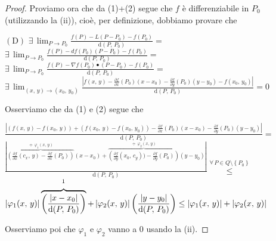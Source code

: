 \begin{proof}
Proviamo ora che da (1)+(2) segue che $f$ è differenziabile in $P_0$ (utilizzando la (ii)), cioè, per definizione, dobbiamo provare che
\begin{center}
$\mathrm{(D)}$
\hfill
$\displaystyle
\exists \, \lim_{P \rightarrow P_0} \frac{f(P)-L(P-P_0)-f(P_0)}{\mathrm{d}(P,\,P_0)} =$
\hfill \null \\
\vskip 16pt
\hfill
$\displaystyle
\exists \, \lim_{P \rightarrow P_0} \frac{f(P)-df(P_0)(P-P_0)-f(P_0)}{\mathrm{d}(P,\,P_0)} =$
\hfill \null \\
\vskip 16pt
\hfill
$\displaystyle
\exists \, \lim_{P \rightarrow P_0} \frac{f(P)-\nabla f(P_0) \bullet (P-P_0)-f(P_0)}{\mathrm{d}(P,\,P_0)} =$
\hfill \null \\
\vskip 16pt
\hfill
$\displaystyle
\exists \, \lim_{(x,\,y) \rightarrow (x_0,\,y_0)} \frac{\displaystyle \left\lvert f(x,\,y) - \frac{\partial f}{\partial x}(P_0)(x-x_0) - \frac{\partial f}{\partial y}(P_0)(y-y_0) - f(x_0,\,y_0) \right\rvert}{\mathrm{d}(P,\,P_0)} = 0$
\hfill \null \\
\end{center}

Osserviamo che da (1) e (2) segue che
\begin{center}
\hfill
$\displaystyle
\frac{\displaystyle \left\lvert (f(x,\,y)-f(x_0,\,y)) + (f(x_0,\,y)-f(x_0,\,y_0)) - \frac{\partial f}{\partial x}(P_0)(x-x_0) - \frac{\partial f}{\partial y}(P_0)(y-y_0) \right\rvert }{\mathrm{d}(P,\,P_0)} =$
\hfill \null \\
\vskip 16pt
\hfill
$\displaystyle
\frac{\displaystyle \left\lvert \overbrace{\left( \frac{\partial f}{\partial x}(c_x,\,y) - \frac{\partial f}{\partial x}(P_0) \right)}^{\doteqdot \, \varphi_1 (x,\,y)} (x-x_0) + \overbrace{\left( \frac{\partial f}{\partial y}(x_0,\,c_y)) - \frac{\partial f}{\partial y}(P_0) \right)}^{\doteqdot \, \varphi_2 (x,\,y)} (y-y_0) \right\rvert }{\mathrm{d}(P,\,P_0)} \overset{\forall \, P \in Q \setminus \left\lbrace P_0 \right\rbrace}{\leq} $
\hfill \null \\
\hfill
$\displaystyle \left\lvert \varphi_1(x,\,y) \right\rvert \overbrace{\left( \frac{|x-x_0|}{\mathrm{d}(P,\,P_0)} \right)}^{\footnotemark} + \left\lvert \varphi_2(x,\,y) \right\rvert \left( \frac{|y-y_0|}{\mathrm{d}(P,\,P_0)} \right) \leq
\displaystyle \left\lvert \varphi_1(x,\,y) \right\rvert + \left\lvert \varphi_2(x,\,y) \right\rvert$
\hfill \null \\
\end{center}
Osserviamo poi che $\varphi_1$ e $\varphi_2$ vanno a $0$ usando la (ii).


\end{proof}
